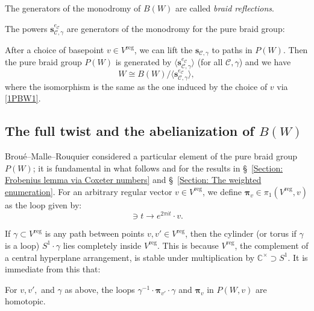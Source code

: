 \documentclass[ALCO, Unicode]{cedram}
\newcommand{\op}[1]{\operatorname{#1}}
\newcommand{\CC}{\mathbb{C}}
\newcommand{\op}[1]{\operatorname{#1}}
\begin{document}
\begin{defi}
The generators of the monodromy of $B(W)$ are called {\it\color{blue} braid reflections}.
\end{defi}

\noindent The powers $\bm s_{\mathcal{C},\gamma}^{e_{\mathcal{C}}}$ are generators of the monodromy for the pure braid group: 

\begin{prop}\label{Prop: (braid reflections)^e_c generate P(W)}
After a choice of basepoint $v\in V^{\op{reg}}$, we can lift the $\bm s_{\mathcal{C},\gamma}$ to paths in $P(W)$. Then the pure braid group $P(W)$ is generated by $\langle \bm s_{\mathcal{C},\gamma}^{e_{\mathcal{C}}}\rangle$ (for all $\mathcal{C},\gamma$) and we have $$W\cong B(W)/\langle \bm s_{\mathcal{C},\gamma}^{e_{\mathcal{C}}}\rangle,$$ where the isomorphism is the same as the one induced by the choice of $v$ via \eqref{1PBW1}.
\end{prop} 



\subsection{The full twist and the abelianization of $B(W)$}


Brou{\'e}--Malle--Rouquier considered \cite[Notation~2.3]{broue-malle-rouquier-braid-hecke} a particular element of the pure braid group $P(W)$; it is fundamental in what follows and for the results in \S~\ref{Section: Frobenius lemma via Coxeter numbers} and \S~\ref{Section: The weighted enumeration}. For an arbitrary regular vector $v\in V^{\op{reg}}$, we define $\bm \pi_v\in\pi_1(V^{\op{reg}},v)$ as the loop given by: \begin{equation}[0,1]\ni t\rightarrow e^{2\pi i t}\cdot v.\label{EQ: full twist definition} \end{equation}

If $\gamma\subset V^{\op{reg}}$ is any path between points $v, v' \in V^{\op{reg}}$, then the cylinder (or torus if $\gamma$ is a loop) $S^1\cdot \gamma$ lies completely inside $V^{\op{reg}}$. This is because $V^{\op{reg}}$, the complement of a central hyperplane arrangement, is stable under multiplication by $\CC^{\times}\supset S^1$. It is immediate from this that:

\begin{lemma}\label{Lemma: full twist is central in fund. groupoid of V^reg}
For $v,v',$ and $\gamma$ as above, the loops $\gamma^{-1}\cdot\bm\pi_{v'}\cdot\gamma$ and $\bm\pi_v$ in $P(W,v)$ are homotopic. 
\end{lemma}
\end{document}
